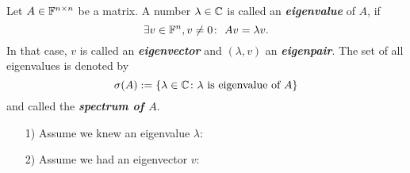 \begin{frame}
\begin{defi}\label{def:eigvals}
	Let $A\in{\mathbb{F}}^{n\times n}$ be a matrix. A number $\lambda\in {\mathbb{C}}$ is called an \textbf{\emph{eigenvalue}} of $A$, if 
	$$\exists v\in {\mathbb{F}}^n, v\neq 0\colon~Av=\lambda v.$$ In that case, $v$ is called an \textbf{\emph{eigenvector}} and $(\lambda, v)$ an \textbf{\textit{eigenpair}}. The set of all eigenvalues is denoted by
	$$\sigma(A):=\{\lambda\in {\mathbb{C}}\colon \lambda \text{ is eigenvalue of }A\}$$ and called the \textbf{\emph{spectrum of $A$}}.
\end{defi}

\begin{itemize}
	\item[1)] Assume we knew an eigenvalue $\lambda$:\\
    \vspace{0.5cm}
	\item[2)]  Assume we had an eigenvector $v$:\\
\end{itemize}
\end{frame}



